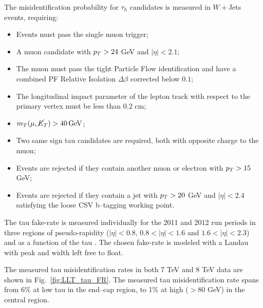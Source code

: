 The misidentification probability for $\tau_h$ candidates is measured in $W+$Jets events, requiring:
\begin{itemize}
\item Events must pass the single muon trigger;
\item A muon candidate with $p_{T} > 24$ GeV and $|\eta| < 2.1$;
\item The muon must pass the tight Particle Flow identification and have a combined PF Relative Isolation $\Delta \beta $ corrected below $0.1$;
\item The longitudinal impact parameter of the lepton track with respect to the primary vertex must be less than 0.2 cm;
\item $m_{T}(\mu, \cancel{E}_T) > 40\, \mathrm{GeV}$;
\item Two same sign tau candidates are required, both with opposite charge to the muon;
\item Events are rejected if they contain another muon or electron with $p_{T} > 15$ GeV;
\item Events are rejected if they contain a jet with $p_{T} > 20$ GeV and $|\eta|< 2.4$ satisfying the loose CSV b--tagging working point.
\end{itemize}
The tau fake-rate is measured individually for the 2011 and 2012 run periods in three regions of pseudo-rapidity ($|\eta|<0.8$,
\mbox{$0.8<|\eta|<1.6$} and $1.6<|\eta|<2.3$) and as a function of the tau \pT. The chosen fake-rate is modeled with a Landau with peak and
width left free to float.%

The measured tau misidentification rates in both 7 TeV and 8 TeV data are shown in Fig.~\ref{fig:LLT_tau_FR}. The measured tau misidentification rate spans from 6\% at low tau \pT in the end--cap region, to 1\% at high \pT ($ > 80$ GeV) in the central region.

